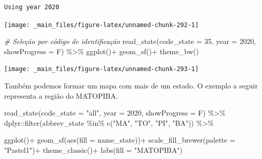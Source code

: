 \documentclass[
  brazilian,
]{book}
\newenvironment{Shaded}{\begin{snugshade}}{\end{snugshade}}
\newcommand{\AttributeTok}[1]{\textcolor[rgb]{0.77,0.63,0.00}{#1}}
\newcommand{\CommentTok}[1]{\textcolor[rgb]{0.56,0.35,0.01}{\textit{#1}}}
\newcommand{\DecValTok}[1]{\textcolor[rgb]{0.00,0.00,0.81}{#1}}
\newcommand{\FunctionTok}[1]{\textcolor[rgb]{0.00,0.00,0.00}{#1}}
\newcommand{\NormalTok}[1]{#1}
\newcommand{\SpecialCharTok}[1]{\textcolor[rgb]{0.00,0.00,0.00}{#1}}
\newcommand{\StringTok}[1]{\textcolor[rgb]{0.31,0.60,0.02}{#1}}
\begin{document}
\begin{verbatim}
Using year 2020
\end{verbatim}

\begin{center}\texttt{[image: \_main\_files/figure-latex/unnamed-chunk-292-1]} \end{center}

\begin{Shaded}
\begin{Highlighting}[]
\CommentTok{\# Seleção por código de identificação}
\FunctionTok{read\_state}\NormalTok{(}\AttributeTok{code\_state =} \DecValTok{35}\NormalTok{,}
           \AttributeTok{year =} \DecValTok{2020}\NormalTok{,}
           \AttributeTok{showProgress =}\NormalTok{ F) }\SpecialCharTok{\%\textgreater{}\%} 
  \FunctionTok{ggplot}\NormalTok{()}\SpecialCharTok{+}
  \FunctionTok{geom\_sf}\NormalTok{()}\SpecialCharTok{+}
  \FunctionTok{theme\_bw}\NormalTok{()}
\end{Highlighting}
\end{Shaded}

\begin{center}\texttt{[image: \_main\_files/figure-latex/unnamed-chunk-293-1]} \end{center}

Também podemos formar um mapa com mais de um estado. O exemplo a seguir representa a região do MATOPIBA.

\begin{Shaded}
\begin{Highlighting}[]
\FunctionTok{read\_state}\NormalTok{(}\AttributeTok{code\_state =} \StringTok{"all"}\NormalTok{,}
           \AttributeTok{year =} \DecValTok{2020}\NormalTok{,}
           \AttributeTok{showProgress =}\NormalTok{ F) }\SpecialCharTok{\%\textgreater{}\%} 
\NormalTok{  dplyr}\SpecialCharTok{::}\FunctionTok{filter}\NormalTok{(abbrev\_state }\SpecialCharTok{\%in\%} \FunctionTok{c}\NormalTok{(}\StringTok{"MA"}\NormalTok{, }\StringTok{"TO"}\NormalTok{, }\StringTok{"PI"}\NormalTok{, }\StringTok{"BA"}\NormalTok{)) }\SpecialCharTok{\%\textgreater{}\%} 
  
  \FunctionTok{ggplot}\NormalTok{()}\SpecialCharTok{+}
  \FunctionTok{geom\_sf}\NormalTok{(}\FunctionTok{aes}\NormalTok{(}\AttributeTok{fill =}\NormalTok{ name\_state))}\SpecialCharTok{+}
  \FunctionTok{scale\_fill\_brewer}\NormalTok{(}\AttributeTok{palette =} \StringTok{"Pastel1"}\NormalTok{)}\SpecialCharTok{+}
  \FunctionTok{theme\_classic}\NormalTok{()}\SpecialCharTok{+}
  \FunctionTok{labs}\NormalTok{(}\AttributeTok{fill =} \StringTok{"MATOPIBA"}\NormalTok{)}
\end{Highlighting}
\end{Shaded}
\end{document}
